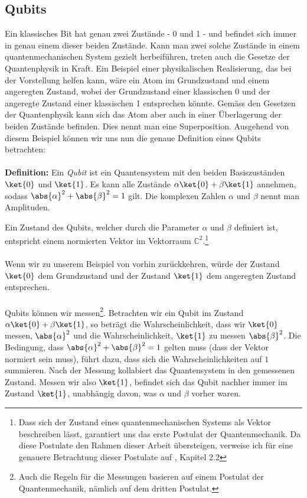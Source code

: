 \subsection{Qubits}
Ein klassisches Bit hat genau zwei Zustände - 0 und 1 - und befindet sich immer in genau einem dieser beiden Zustände. Kann man zwei solche Zustände in einem quantenmechanischen System gezielt herbeiführen, treten auch die Gesetze der Quantenphysik in Kraft. Ein Beispiel einer physikalischen Realisierung, das bei der Vorstellung helfen kann, wäre ein Atom im Grundzustand und einem angeregten Zustand, wobei der Grundzustand einer klassischen 0 und der angeregte Zustand einer klassischen 1 entsprechen könnte. Gemäss den Gesetzen der Quantenphysik kann sich das Atom aber auch in einer Überlagerung der beiden Zustände befinden. Dies nennt man eine Superposition. Ausgehend von diesem Beispiel können wir uns nun die genaue Definition eines Qubits betrachten:
\paragraph{}
\textbf{Definition:} Ein \textit{Qubit} ist ein Quantensystem mit den beiden Basiszuständen $\ket{0}$ und $\ket{1}$. Es kann alle Zustände $\alpha\ket{0} + \beta\ket{1}$ annehmen, sodass $\abs{\alpha}^2 + \abs{\beta}^2 = 1$ gilt. Die komplexen Zahlen $\alpha$ und $\beta$ nennt man Amplituden.

Ein Zustand des Qubits, welcher durch die Parameter $\alpha$ und $\beta$ definiert ist, entspricht einem normierten Vektor im Vektorraum $\mathbb{C}^2$.\footnote{Dass sich der Zustand eines quantenmechanischen Systems als Vektor beschreiben lässt, garantiert uns das erste Postulat der Quantenmechanik. Da diese Postulate den Rahmen dieser Arbeit übersteigen, verweise ich für eine genauere Betrachtung dieser Postulate auf \cite{QC}, Kapitel 2.2}

\paragraph{}
Wenn wir zu unserem Beispiel von vorhin zurückkehren, würde der Zustand $\ket{0}$ dem Grundzustand und der Zustand $\ket{1}$ dem angeregten Zustand entsprechen.
\paragraph{}

Qubits können wir messen\footnote{Auch die Regeln für die Messungen basieren auf einem Postulat der Quantenmechanik, nämlich auf dem dritten Postulat.}. Betrachten wir ein Qubit im Zustand $\alpha\ket{0} + \beta\ket{1}$, so beträgt die Wahrscheinlichkeit, dass wir $\ket{0}$ messen, $\abs{\alpha}^2$ und die Wahrscheinlichkeit, $\ket{1}$ zu messen $\abs{\beta}^2$. Die Bedingung, dass $\abs{\alpha}^2 + \abs{\beta}^2 = 1$ gelten muss (dass der Vektor normiert sein muss), führt dazu, dass sich die Wahrscheinlichkeiten auf $1$ summieren. Nach der Messung kollabiert das Quantensystem in den gemessenen Zustand. Messen wir also $\ket{1}$, befindet sich das Qubit nachher immer im Zustand $\ket{1}$, unabhängig davon, was $\alpha$ und $\beta$ vorher waren.

